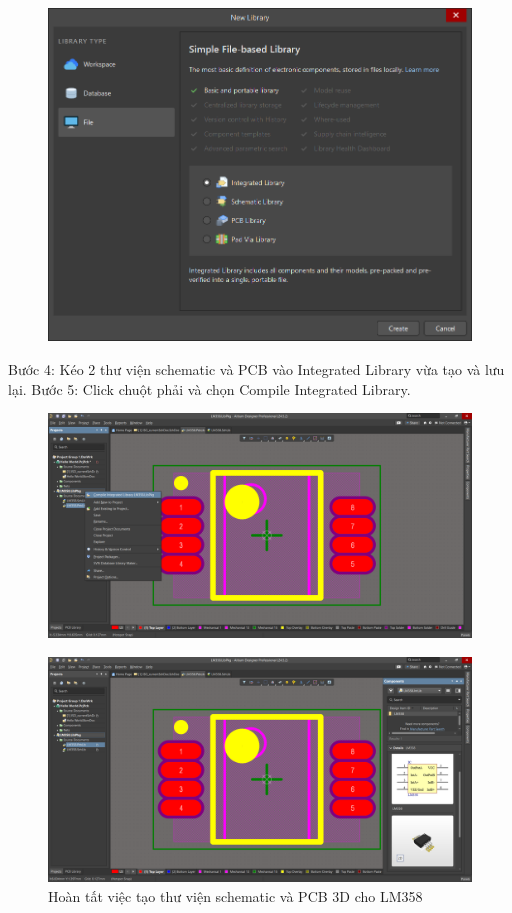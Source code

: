                 \begin{figure}[H]
                    \centering
                    \includegraphics[width=1\textwidth]{pictures/ch3.15.png}
                \end{figure}
                Bước 4: Kéo 2 thư viện schematic và PCB vào Integrated Library vừa tạo và lưu lại. 
                Bước 5: Click chuột phải và chọn Compile Integrated Library.
                \begin{figure}[H]
                    \centering
                    \includegraphics[width=1\textwidth]{pictures/ch3.16.png}
                \end{figure}
                \begin{figure}[H]
                    \centering
                    \includegraphics[width=1\textwidth]{pictures/ch3.14.png}
                    \caption{Hoàn tất việc tạo thư viện schematic và PCB 3D cho LM358} 
                \end{figure}
                \cleardoublepage